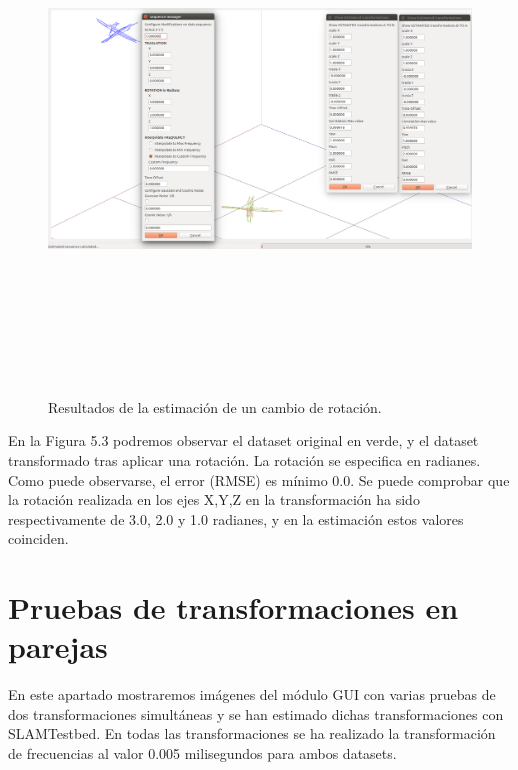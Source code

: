 \begin{figure}[H]
\label{fig:rotationTest}\includegraphics[height=14.0cm,width=18.0cm]{img/cap6/Rotation_ab_ba.png}
\hspace{0.5cm}


\caption{Resultados de la estimación de un cambio de rotación.}
\end{figure}

En la Figura 5.3 podremos observar el dataset original en verde, y el dataset transformado tras aplicar una rotación. La rotación se especifica en radianes. Como puede observarse, el error (RMSE) es mínimo 0.0. Se puede comprobar que la rotación realizada en los ejes X,Y,Z en la transformación ha sido respectivamente de 3.0, 2.0 y 1.0 radianes, y en la estimación estos valores coinciden.


\section{Pruebas de transformaciones en parejas}
En este apartado mostraremos imágenes del módulo GUI con varias pruebas de dos  transformaciones simultáneas y se han estimado dichas transformaciones con SLAMTestbed.
En todas las transformaciones se ha realizado la transformación de frecuencias al valor 0.005 milisegundos para ambos datasets. 

